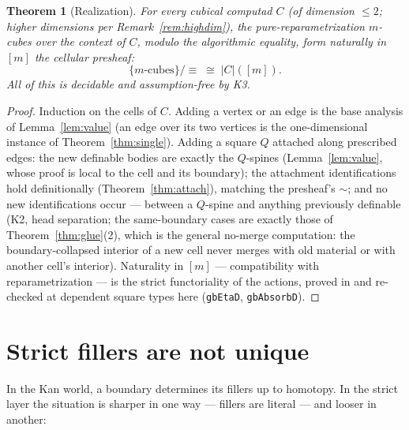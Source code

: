 \documentclass[11pt]{amsart}
\newtheorem{thm}{Theorem}[section]
\theoremstyle{definition}
\newcommand{\aconv}{\equiv}
\newcommand{\Real}[1]{|#1|}
\begin{document}
\begin{thm}[Realization]\label{thm:main}
  For every cubical computad $C$ (of dimension $\le 2$; higher
  dimensions per Remark~\ref{rem:highdim}), the
  pure-reparametrization $m$-cubes over the context of $C$, modulo
  the algorithmic equality, form naturally in $[m]$ the cellular
  presheaf:
  \[
    \{\text{$m$-cubes}\}/{\aconv} \;\cong\; \Real{C}([m]).
  \]
  All of this is decidable and assumption-free by K3.
\end{thm}
\begin{proof}
  Induction on the cells of $C$.  Adding a vertex or an edge is the
  base analysis of Lemma~\ref{lem:value} (an edge over its two
  vertices is the one-dimensional instance of
  Theorem~\ref{thm:single}).  Adding a square $Q$ attached along
  prescribed edges: the new definable bodies are exactly the
  $Q$-spines (Lemma~\ref{lem:value}, whose proof is local to the
  cell and its boundary); the attachment identifications hold
  definitionally (Theorem~\ref{thm:attach}), matching the
  presheaf's $\sim$; and no new identifications occur --- between a
  $Q$-spine and anything previously definable (K2, head
  separation; the same-boundary cases are exactly those of
  Theorem~\ref{thm:glue}(2), which is the general no-merge
  computation: the boundary-collapsed interior of a new cell never
  merges with old material or with another cell's interior).
  Naturality in $[m]$ --- compatibility with reparametrization ---
  is the strict functoriality of the actions, proved in
  \cite[Lemmas 4.2--4.3]{Sphere} and re-checked at dependent
  square types here (\texttt{gbEtaD}, \texttt{gbAbsorbD}).
\end{proof}

\section{Strict fillers are not unique}
\label{sec:fillers}

In the Kan world, a boundary determines its fillers up to homotopy.
In the strict layer the situation is sharper in one way --- fillers
are literal --- and looser in another:
\end{document}
